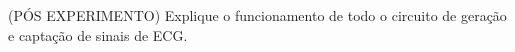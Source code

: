 \documentclass[addpoints]{exam}
\begin{document}
\begin{questions}
\begin{parts}
\pagebreak

\end{parts}

\question (PÓS EXPERIMENTO) Explique o funcionamento de todo o circuito de geração e captação de sinais de ECG.

\begin{framed}
\vspace{19cm}
\end{framed}


\end{questions}


\end{document}
